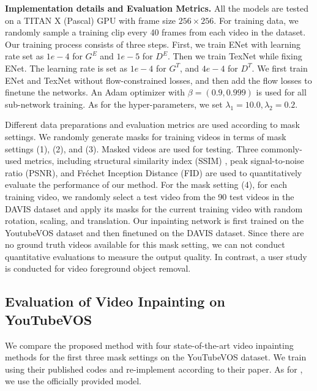 \noindent \textbf{Implementation details and Evaluation Metrics.} 
All the models are tested on a TITAN X (Pascal) GPU with frame size $256 \times 256$.
For training data, we randomly sample a training clip every 40 frames from each video in the dataset. Our training process consists of three steps. First, we train ENet with learning rate set as $1e-4$ for $G^E$ and $1e-5$ for $D^E$. 
Then we train TexNet while fixing ENet. The learning rate is set as $1e-4$ for $G^T$, and $4e-4$ for $D^T$.
We first train ENet and TexNet without flow-constrained losses, and then add the flow losses to finetune the networks.
An Adam optimizer with $\beta=(0.9, 0.999)$ is used for all sub-network training.
As for the hyper-parameters, we set $\lambda_1=10.0,\lambda_2=0.2$.

Different data preparations and evaluation metrics are used according to mask settings. We randomly generate masks for training videos in terms of mask settings (1), (2), and (3). 
Masked videos are used for testing.
Three commonly-used metrics, including structural similarity index (SSIM) \cite{wang2004image}, peak signal-to-noise ratio (PSNR), and Fr{\'e}chet Inception Distance (FID) \cite{heusel2017gans} are used to quantitatively evaluate the performance of our method. 
For the mask setting (4), for each training video, we randomly select a test video from the 90 test videos in the DAVIS dataset and apply its masks for the current training video with random rotation, scaling, and translation.
Our inpainting network is first trained on the YoutubeVOS dataset and then finetuned on the DAVIS dataset. 
Since there are no ground truth videos available for this mask setting, we can not conduct quantitative evaluations to measure the output quality. In contrast, a user study is conducted for video foreground object removal.  


 


\subsection{Evaluation of Video Inpainting on YouTubeVOS}
We compare the proposed method with four state-of-the-art video inpainting methods \cite{nazeri2019edgeconnect,wang2019video,Kim_2019_CVPR1,Xu_2019_CVPR}
for the first three mask settings on the YouTubeVOS dataset.
%
We train \cite{nazeri2019edgeconnect,Xu_2019_CVPR} using their published codes and re-implement \cite{wang2019video} according to their paper. As for \cite{Kim_2019_CVPR1}, we use the officially provided model.

